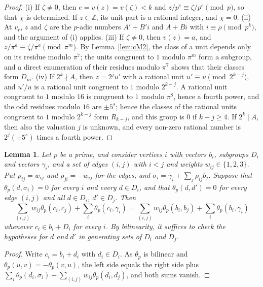 \documentclass[11pt]{article}
\newtheorem{lemma}[theorem]{Lemma}
\newcommand{\Z}{\mathbb{Z}}
\begin{document}
\begin{proof}
(i) If $\zeta\neq0$, then $e=v(z)=v(\zeta)<k$ and $z/p^e\equiv\zeta/p^e\pmod p$, so that $\chi$ is determined. If $z\in\Z$, its unit part is a rational integer, and $\chi=0$. (ii) At $v_r$, $z$ and $\zeta$ are the $p$-adic numbers $A'+B'i$ and $A+Bi$ with $i\equiv\rho\pmod{p^k}$, and the argument of (i) applies. (iii) If $\zeta\neq0$, then $v(z)=a$, and $z/\pi^a\equiv\zeta/\pi^a\pmod{\pi^m}$. By Lemma~\ref{lem:cM2}, the class of a unit depends only on its residue modulo $\pi^7$; the units congruent to $1$ modulo $\pi^m$ form a subgroup, and a direct enumeration of their residues modulo $\pi^7$ shows that their classes form $D_m$. (iv) If $2^k\nmid A$, then $z=2^ju'$ with a rational unit $u'\equiv u\pmod{2^{k-j}}$, and $u'/u$ is a rational unit congruent to $1$ modulo $2^{k-j}$. A rational unit congruent to $1$ modulo $16$ is congruent to $1$ modulo $\pi^8$, hence a fourth power, and the odd residues modulo $16$ are $\pm5^s$; hence the classes of the rational units congruent to $1$ modulo $2^{k-j}$ form $R_{k-j}$, and this group is $0$ if $k-j\geq4$. If $2^k\mid A$, then also the valuation $j$ is unknown, and every non-zero rational number is $2^j(\pm5^s)$ times a fourth power.
\end{proof}

\begin{lemma}\label{lem:cenvelope}
Let $p$ be a prime, and consider vertices $i$ with vectors $b_i$, subgroups $D_i$ and vectors $\gamma_i$, and a set of edges $(i,j)$ with $i<j$ and weights $w_{ij}\in\{1,2,3\}$. Put $\rho_{ij}=w_{ij}$ and $\rho_{ji}=-w_{ij}$ for the edges, and $\sigma_i=\gamma_i+\sum_j\rho_{ij}b_j$. Suppose that $\theta_p(d,\sigma_i)=0$ for every $i$ and every $d\in D_i$, and that $\theta_p(d,d')=0$ for every edge $(i,j)$ and all $d\in D_i$, $d'\in D_j$. Then
\[
\sum_{(i,j)}w_{ij}\theta_p(c_i,c_j)+\sum_i\theta_p(c_i,\gamma_i)=\sum_{(i,j)}w_{ij}\theta_p(b_i,b_j)+\sum_i\theta_p(b_i,\gamma_i)
\]
whenever $c_i\in b_i+D_i$ for every $i$. By bilinearity, it suffices to check the hypotheses for $d$ and $d'$ in generating sets of $D_i$ and $D_j$.
\end{lemma}

\begin{proof}
Write $c_i=b_i+d_i$ with $d_i\in D_i$. As $\theta_p$ is bilinear and $\theta_p(u,v)=-\theta_p(v,u)$, the left side equals the right side plus $\sum_i\theta_p(d_i,\sigma_i)+\sum_{(i,j)}w_{ij}\theta_p(d_i,d_j)$, and both sums vanish.
\end{proof}
\end{document}
